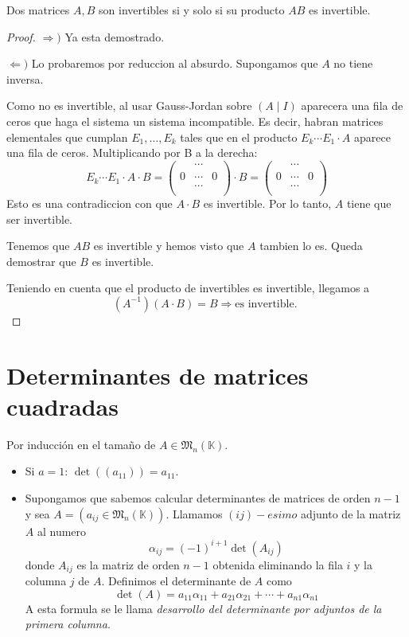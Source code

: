 \begin{proposition}
	Dos matrices \(A, B \) son invertibles si y solo si su producto \(AB \) es invertible.
\end{proposition}
\begin{proof}
	\(\Rightarrow )\) Ya esta demostrado.

	\(\Leftarrow ) \) Lo probaremos por reduccion al absurdo. Supongamos que \(A \) no tiene inversa.

	Como no es invertible, al usar Gauss-Jordan sobre \((A \mid I )\) aparecera una fila de ceros que haga el sistema un sistema incompatible. Es decir, habran matrices elementales que cumplan \(E_1, \ldots, E_k \) tales que en el producto \(E_k \cdots E_1 \cdot A \) aparece una fila de ceros. Multiplicando por B a la derecha:
	\[
		E_k \cdots E_1 \cdot A \cdot B = \begin{pmatrix}
			  & \cdots &   \\
			0 & \cdots & 0 \\
			  & \cdots &   \\
		\end{pmatrix} \cdot B = \begin{pmatrix}
			  & \cdots &   \\
			0 & \cdots & 0 \\
			  & \cdots &   \\
		\end{pmatrix}
	\]
	Esto es una contradiccion con que \(A \cdot B \) es invertible. Por lo tanto, \(A \) tiene que ser invertible.

	Tenemos que \(AB \) es invertible y hemos visto que \(A \) tambien lo es. Queda demostrar que \(B \) es invertible.

	Teniendo en cuenta que el producto de invertibles es invertible, llegamos a
	\[
		(A^{-1} )(A\cdot B) = B \Rightarrow \text{es invertible. }
	\]
\end{proof}

\section{Determinantes de matrices cuadradas}
\begin{definition}[Determinante]
	Por inducción en el tamaño de \(A \in \mathfrak{M}_{n}(\mathbb{K}) \).

	\begin{itemize}
		\item Si \(a = 1\): \(\det((a_{11})) = a_{11}\).
		\item
		      Supongamos que sabemos calcular determinantes de matrices de orden \(n - 1 \) y sea \(A = (a_{ij} \in \mathfrak{M}_{n}(\mathbb{K}) )\). Llamamos \((ij)-esimo \) adjunto de la matriz \(A \) al numero
		      \[
			      \alpha_{ij} = (-1)^{i+1}\det(A_{ij})
		      \]
		      donde \(A_{ij } \) es la matriz de orden \(n - 1\) obtenida eliminando la fila \(i \) y la columna \(j \) de \(A \). Definimos el determinante de \(A \) como
		      \[
			      \det(A) = a_{11}\alpha_{11} + a_{21}\alpha_{21} + \cdots + a_{n1}\alpha_{n1}
		      \]
		      A esta formula se le llama \textit{desarrollo del determinante por adjuntos de la primera columna}.
	\end{itemize}
\end{definition}

